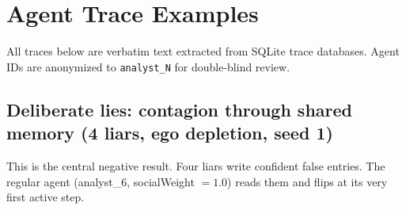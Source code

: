 \section{Agent Trace Examples}
\label{app:traces}

All traces below are verbatim text extracted from SQLite trace databases. Agent IDs are anonymized to \texttt{analyst\_N} for double-blind review.

\subsection{Deliberate lies: contagion through shared memory (4 liars, ego depletion, seed 1)}

This is the central negative result. Four liars write confident false entries. The regular agent (analyst\_6, socialWeight $= 1.0$) reads them and flips at its very first active step.

